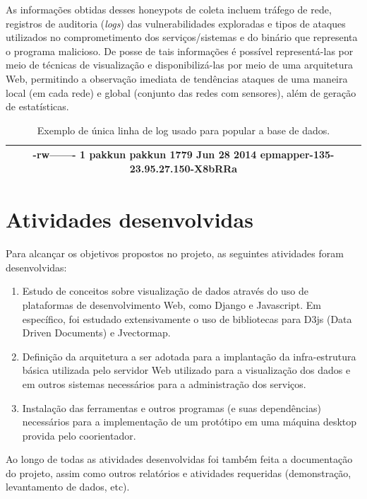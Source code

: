 \documentclass[Portuguese]
{ic-tese-v2}
\begin{document}
As informações obtidas desses honeypots de coleta incluem tráfego de rede, registros de auditoria (\emph{logs}) das vulnerabilidades exploradas e tipos de ataques utilizados no comprometimento dos serviços/sistemas e do binário que representa o programa malicioso. De posse de tais informações é possível representá-las  por meio de técnicas de visualização e disponibilizá-las por meio de uma arquitetura Web, permitindo a observação imediata de tendências ataques de uma maneira local (em cada rede) e global (conjunto das redes com sensores), além de geração de estatísticas.


\begin{table}
	\center
	\caption{Exemplo de única linha de log usado para popular a base de dados.}
	\label{tab:log}
	\begin{tabular}{|c|}
		\hline
		-rw------- 1 pakkun pakkun  1779 Jun 28  2014 epmapper-135-23.95.27.150-X8bRRa\\
		\hline		
	\end{tabular}
\end{table}

\chapter{Atividades desenvolvidas}

Para alcançar os objetivos propostos no projeto, as seguintes atividades foram desenvolvidas:

\begin{enumerate}
\item Estudo de conceitos sobre visualização de dados através do uso de plataformas de desenvolvimento Web, como Django e Javascript. Em específico, foi estudado extensivamente o uso de bibliotecas para D3js\cite{d3js} (Data Driven Documents) e Jvectormap.\\
\item Definição da arquitetura a ser adotada para a implantação da infra-estrutura básica utilizada pelo servidor Web utilizado para a visualização dos dados e em outros sistemas necessários para a administração dos serviços.\\
\item Instalação das ferramentas e outros programas (e suas dependências) necessários para a implementação de um protótipo em uma máquina desktop provida pelo coorientador.\\
\end{enumerate}

Ao longo de todas as atividades desenvolvidas foi també́m feita a documentação do projeto, assim como outros relatórios e atividades requeridas (demonstração, levantamento de dados, etc).
\end{document}
